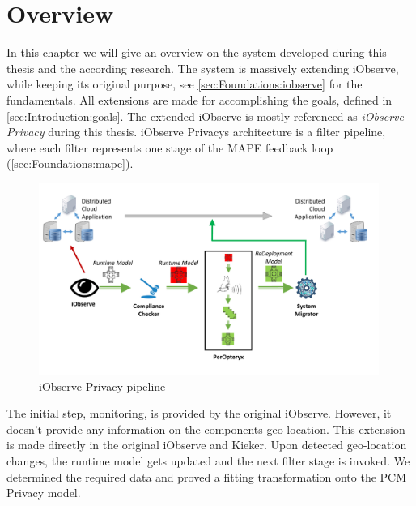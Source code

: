 
\chapter{Overview}
\label{ch:Overview}

In this chapter we will give an overview on the system developed during this thesis and the according research. The system is massively extending iObserve, while keeping its original purpose, see \autoref{sec:Foundations:iobserve} for the fundamentals. All extensions are made for accomplishing the goals, defined in \autoref{sec:Introduction:goals}. The extended iObserve is mostly referenced as \textit{iObserve Privacy} during this thesis. iObserve Privacys architecture is a filter pipeline, where each filter represents one stage of the MAPE feedback loop (\autoref{sec:Foundations:mape}).


\begin{figure}[h]
	\centering
	\includegraphics[width=0.99\textwidth]{pictures/pipeline}
	\caption{iObserve Privacy pipeline}
	\label{fig:pipeline}
\end{figure}

The initial step, monitoring, is provided by the original iObserve. However, it doesn't provide any information on the components geo-location. This extension is made directly in the original iObserve and Kieker. Upon detected geo-location changes, the runtime model gets updated and the next filter stage is invoked. We determined the required data and proved a fitting transformation onto the PCM Privacy model.

